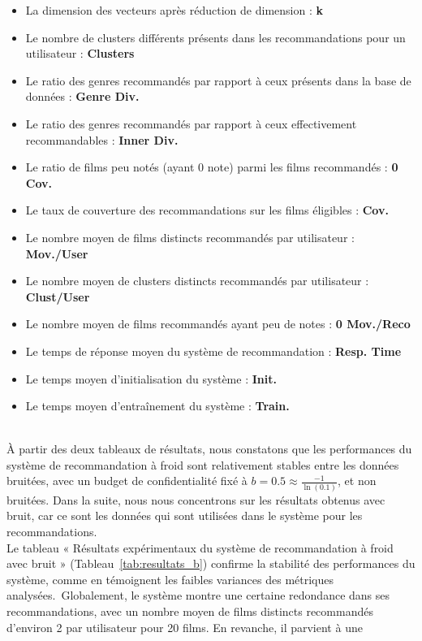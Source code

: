 \documentclass{article}
\begin{document}
\begin{itemize}
    \item La dimension des vecteurs après réduction de dimension : \textbf{k}
    \item Le nombre de clusters différents présents dans les recommandations pour un utilisateur : \textbf{Clusters}
    \item Le ratio des genres recommandés par rapport à ceux présents dans la base de données : \textbf{Genre Div.}
    \item Le ratio des genres recommandés par rapport à ceux effectivement recommandables : \textbf{Inner Div.}
    \item Le ratio de films peu notés (ayant 0 note) parmi les films recommandés : \textbf{0 Cov.}
    \item Le taux de couverture des recommandations sur les films éligibles : \textbf{Cov.}
    \item Le nombre moyen de films distincts recommandés par utilisateur : \textbf{Mov./User}
    \item Le nombre moyen de clusters distincts recommandés par utilisateur : \textbf{Clust/User}
    \item Le nombre moyen de films recommandés ayant peu de notes : \textbf{0 Mov./Reco}
    \item Le temps de réponse moyen du système de recommandation : \textbf{Resp. Time}
    \item Le temps moyen d’initialisation du système : \textbf{Init.}
    \item Le temps moyen d’entraînement du système : \textbf{Train.}
\end{itemize}
$ $\\
À partir des deux tableaux de résultats, nous constatons que les performances du système
de recommandation à froid sont relativement stables entre les données bruitées, avec un budget de confidentialité fixé à $b = 0.5 \approx \frac{-1}{\ln(0.1  )}$, et non bruitées. Dans
la suite, nous nous concentrons sur les résultats obtenus avec bruit, car ce sont les données qui
sont utilisées dans le système pour les recommandations.\\
Le tableau « Résultats expérimentaux du système de recommandation à froid avec bruit » (Tableau~\ref{tab:resultats_b}) confirme la stabilité des performances
du système, comme en témoignent les faibles variances des métriques analysées.\
Globalement, le système montre une certaine redondance dans ses recommandations, avec un nombre moyen de films
distincts recommandés d’environ 2 par utilisateur pour 20 films. En revanche, il parvient à une
\end{document}
